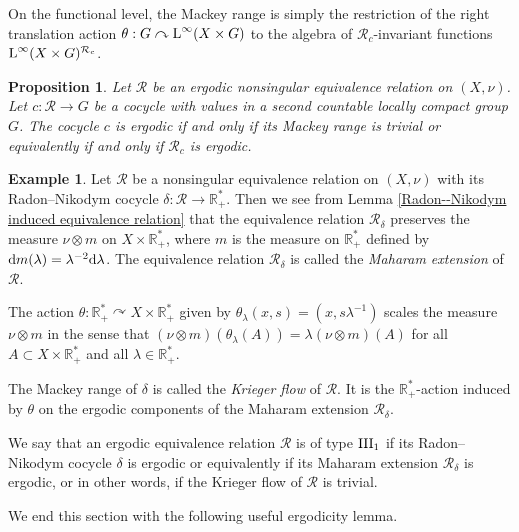 \documentclass[a4paper,11pt]{amsart}
\numberwithin{equation}{section}
\newtheorem{proposition}[theorem]{Proposition}
\theoremstyle{definition}
\newtheorem{example}[theorem]{Example}
\newcommand{\R}{\mathbb{R}}
\newcommand{\rd}{\text{\rm d}}
\newcommand{\rL}{\mathord{\text{\rm L}}}
\newcommand{\cR}{\mathcal{R}}
\newcommand{\III}{{\rm III}}
\begin{document}
On the functional level, the Mackey range is simply the restriction of the right translation action $\theta : G \curvearrowright \rL^\infty(X \times G)$ to the algebra of $\cR_c$-invariant functions $\rL^\infty(X \times G)^{\cR_c}$. 

\begin{proposition} \label{ergodic skew product}
    Let $\cR$ be an ergodic nonsingular equivalence relation on $(X,\nu)$. Let $c : \cR \rightarrow G$ be a cocycle with values in a second countable locally compact group $G$. The cocycle $c$ is ergodic if and only if its Mackey range is trivial or equivalently if and only if $\cR_c$ is ergodic.
\end{proposition}


\begin{example}
Let $\cR$ be a nonsingular equivalence relation on $(X,\nu)$ with its Radon--Nikodym cocycle $\delta : \cR \rightarrow \R^*_+$. Then we see from Lemma \ref{Radon--Nikodym induced equivalence relation} that the equivalence relation $\cR_{\delta}$ preserves the measure $\nu \otimes m$ on $X \times \R^*_+$, where $m$ is the measure on $\R^*_+$ defined by $\rd m(\lambda) = \lambda^{- 2}\rd \lambda$. The equivalence relation $\cR_\delta$ is called the \emph{Maharam extension} of $\cR$.

The action $\theta : \R^*_+ \curvearrowright X \times \R^*_+$ given by $\theta_\lambda(x,s)=(x,s\lambda^{-1})$ scales the measure $\nu \otimes m$ in the sense that $(\nu \otimes m)(\theta_\lambda(A))=\lambda (\nu \otimes m)(A)$ for all $A \subset X \times \R^*_+$ and all $\lambda \in \R^*_+$.

The Mackey range of $\delta$ is called the \emph{Krieger flow} of $\cR$. It is the $\R^*_+$-action induced by $\theta$ on the ergodic components of the Maharam extension $\cR_\delta$.

We say that an ergodic equivalence relation $\cR$ is of type $\III_1$ if its Radon--Nikodym cocycle $\delta$ is ergodic or equivalently if its Maharam extension $\cR_\delta$ is ergodic, or in other words, if the Krieger flow of $\cR$ is trivial.
\end{example}
We end this section with the following useful ergodicity lemma.
\end{document}

